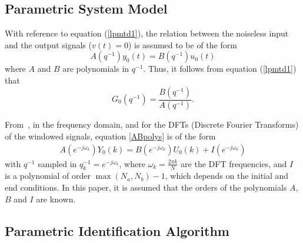 \subsection{Parametric System Model}

With reference to equation (\ref{lpmtd1}), the relation between the noiseless input and the output signals ($v(t)= 0$) is assumed to be of the form
\begin{equation}
    A(q^{-1}) y_0(t) = B(q^{-1}) u_0(t)
\label{ABpolys}
\end{equation}
where $A$ and $B$ are polynomials in $q^{-1}$. Thus, it follows from equation (\ref{lpmtd1}) that
\begin{equation}
    G_0(q^{-1})= \frac{B(q^{-1})}{A(q^{-1})}
    \text{.}
\end{equation}

From~\citep[Section 6.3.2.]{Pintelon2012}, in the frequency domain, and for the DFTs (Discrete Fourier Transforms) of the windowed signals, equation \eqref{ABpolys} is of the form
\begin{align}
A(e^{-j\omega_k})Y_0(k) = B(e^{-j\omega_k})U_0(k) + I(e^{-j\omega_k})
\label{DFTspectra}
\end{align}
with $q^{-1}$ sampled in  $q_k^{-1} = e^{-j\omega_k}$, where $\omega_k = \frac{2\pi k}{N}$ are the DFT frequencies, and $I$ is a polynomial of order $\max(N_a,N_b) - 1$, which depends on the initial and end conditions. 
In this paper, it is assumed that the orders of the polynomials $A$, $B$ and $I$ are known.

\subsection{Parametric Identification Algorithm}\label{se:paramIdentAlgo}


